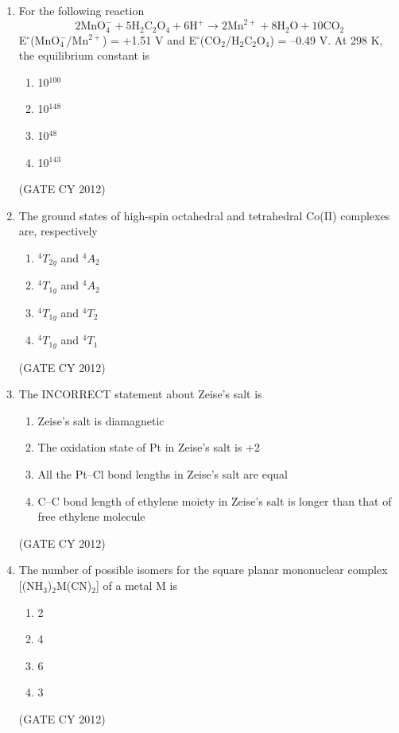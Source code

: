 \documentclass[12pt]{article}
\begin{document}
\begin{enumerate}
\item For the following reaction
\[
2\text{MnO}_4^- + 5\text{H}_2\text{C}_2\text{O}_4 + 6\text{H}^+ \longrightarrow 2\text{Mn}^{2+} + 8\text{H}_2\text{O} + 10\text{CO}_2
\]
E$^\circ$(MnO$_4^-$/Mn$^{2+}$) = +1.51 V and E$^\circ$(CO$_2$/H$_2$C$_2$O$_4$) = –0.49 V. 
At 298 K, the equilibrium constant is
\begin{multicols}{2}
\begin{enumerate}
\item 10$^{100}$
\item 10$^{148}$
\item 10$^{48}$
\item 10$^{143}$
\end{enumerate}
\end{multicols}
\hfill (GATE CY 2012)
\degree

\item The ground states of high-spin octahedral and tetrahedral Co(II) complexes are, respectively
\begin{multicols}{2}
\begin{enumerate}
\item $^4T_{2g}$ and $^4A_2$
\item $^4T_{1g}$ and $^4A_2$
\item $^4T_{1g}$ and $^4T_2$
\item $^4T_{1g}$ and $^4T_1$
\end{enumerate}
\end{multicols}
\hfill (GATE CY 2012)


\item The INCORRECT statement about Zeise’s salt is
\begin{multicols}{2}
\begin{enumerate}
\item Zeise’s salt is diamagnetic
\item The oxidation state of Pt in Zeise’s salt is +2
\item All the Pt–Cl bond lengths in Zeise’s salt are equal
\item C–C bond length of ethylene moiety in Zeise’s salt is longer than that of free ethylene molecule
\end{enumerate}
\end{multicols}
\hfill (GATE CY 2012)


\item The number of possible isomers for the square planar mononuclear complex [(NH$_3$)$_2$M(CN)$_2$] of a metal M is
\begin{multicols}{2}
\begin{enumerate}
\item 2
\item 4
\item 6
\item 3
\end{enumerate}
\end{multicols}
\hfill (GATE CY 2012)


\end{enumerate}
\end{document}
